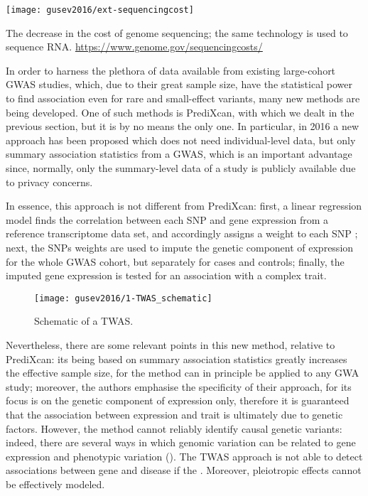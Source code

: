 \documentclass[../main.tex]{subfiles}
\begin{document}
\begin{marginfigure}[-4cm]
	\texttt{[image: gusev2016/ext-sequencingcost]}
	\caption[Sequencing cost over time]{The decrease in the cost of 
	genome sequencing; the same technology is used to sequence RNA. 
	\url{https://www.genome.gov/sequencingcosts/}}
\end{marginfigure}

In order to harness the plethora of data available from existing 
large-cohort GWAS studies, which, due to their great sample size, have 
the statistical power to find association even for rare and small-effect 
variants, many new methods are being developed. One of such methods is 
PrediXcan, with which we dealt in the previous section, but it is by no 
means the only one. In particular, in 2016 a new approach has been 
proposed which does not need individual-level data, but only summary 
association statistics from a GWAS, which is an important advantage since, 
normally, only the summary-level data of a study is publicly available 
due to privacy concerns.

In essence, this approach is not different from PrediXcan: first, a 
linear regression model finds the correlation between each SNP and gene 
expression from a reference transcriptome data set, and accordingly 
assigns a weight to each SNP ; next, the SNPs weights are 
used to impute the \cis genetic component of expression for the whole 
GWAS cohort, but separately for cases and controls; 
finally, the imputed gene expression is tested for an association 
 with a complex trait.

\begin{figure}
	\texttt{[image: gusev2016/1-TWAS\_schematic]}
	\caption{Schematic of a TWAS.}
\end{figure}

Nevertheless, there are some relevant points in this new method, 
relative to PrediXcan: its being based on summary association statistics 
greatly increases the effective sample size, for the method can in 
principle be applied to any GWA study; moreover, the authors emphasise 
the specificity of their approach, for its focus is on the genetic 
component of expression only, therefore it is guaranteed that the 
association between expression and trait is ultimately due to genetic 
factors. However, the method cannot reliably identify causal genetic 
variants: indeed, there are several ways in which genomic variation can 
be related to gene expression and phenotypic variation 
(). The TWAS approach is not able to detect 
associations between gene and disease if the . Moreover, pleiotropic 
effects cannot be effectively modeled.
\end{document}

